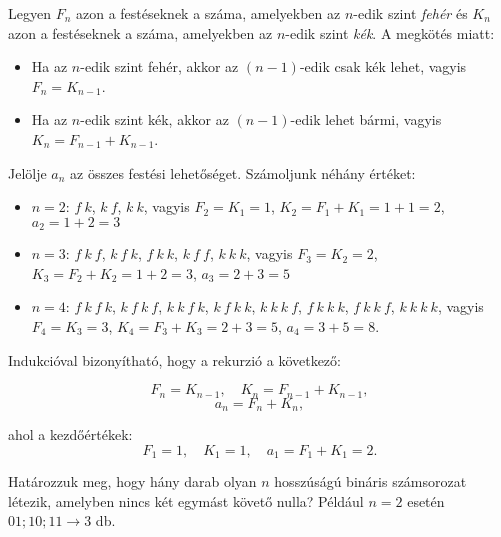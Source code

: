 \begin{solution}
Legyen $F_{n}$ azon a festéseknek a száma, amelyekben az $n$-edik
szint \emph{fehér} és $K_{n}$ azon a festéseknek a száma, amelyekben
az $n$-edik szint \emph{kék}. A megkötés miatt: 
\begin{itemize}
\item Ha az $n$-edik szint fehér, akkor az $(n-1)$-edik csak kék lehet,
vagyis $F_{n}=K_{n-1}$. 
\item Ha az $n$-edik szint kék, akkor az $(n-1)$-edik lehet bármi, vagyis
$K_{n}=F_{n-1}+K_{n-1}$. 
\end{itemize}
Jelölje $a_{n}$ az összes festési lehetőséget. Számoljunk néhány
értéket: 
\begin{itemize}
\item $n=2$: \quad{}$f\ k$, $k\ f$, $k\ k$, vagyis $F_{2}=K_{1}=1$,
\quad{}$K_{2}=F_{1}+K_{1}=1+1=2$, \quad{}$a_{2}=1+2=3$ 
\item $n=3$: \quad{}$f\ k\ f$, $k\ f\ k$, $f\ k\ k$, $k\ f\ f$, $k\ k\ k$,
vagyis $F_{3}=K_{2}=2$, \quad{}$K_{3}=F_{2}+K_{2}=1+2=3$, \quad{}$a_{3}=2+3=5$ 
\item $n=4$: \quad{}$f\ k\ f\ k$, $k\ f\ k\ f$, $k\ k\ f\ k$, $k\ f\ k\ k$,
$k\ k\ k\ f$, $f\ k\ k\ k$, $f\ k\ k\ f$, $k\ k\ k\ k$, vagyis
$F_{4}=K_{3}=3$, \quad{}$K_{4}=F_{3}+K_{3}=2+3=5$, \quad{}$a_{4}=3+5=8$. 
\end{itemize}
Indukcióval bizonyítható, hogy a rekurzió a következő:

\[
F_{n}=K_{n-1},\quad K_{n}=F_{n-1}+K_{n-1},
\]
\[
a_{n}=F_{n}+K_{n},
\]

ahol a kezdőértékek: 
\[
F_{1}=1,\quad K_{1}=1,\quad a_{1}=F_{1}+K_{1}=2.
\]
\end{solution}
\begin{problem}
Határozzuk meg, hogy hány darab olyan $n$ hosszúságú bináris számsorozat
létezik, amelyben nincs két egymást követő nulla? Például $n=2$ esetén
$01;10;11\rightarrow3$ db. 
\end{problem}

